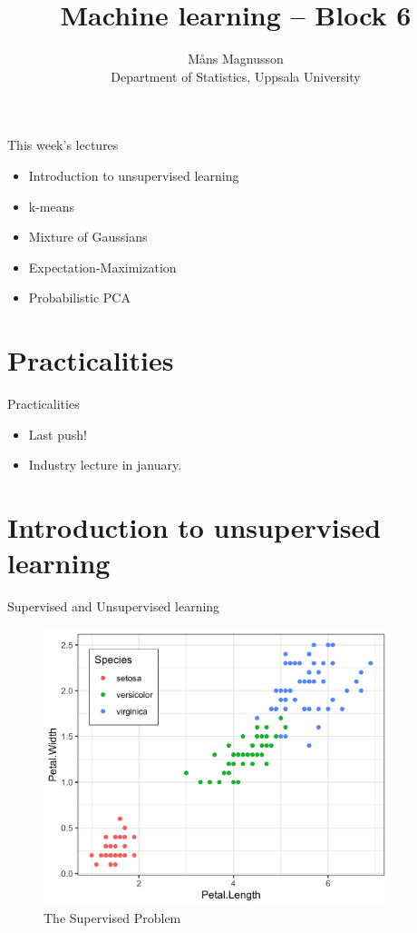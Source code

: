 \documentclass[10pt]{beamer}
\title[]{{\color{black}Machine learning -- Block 6}}
\author[]{M{\aa}ns Magnusson\\Department of Statistics, Uppsala University}
\date{\currentsemester}
\begin{document}
\frame{\titlepage
}



\begin{frame}{This week's lectures}
\begin{itemize}
\item Introduction to unsupervised learning
\item k-means
\item Mixture of Gaussians
\item Expectation-Maximization
\item Probabilistic PCA
\end{itemize}
\end{frame}





\section{Practicalities}

\begin{frame}{Practicalities}

\begin{itemize}
\item Last push!
\item Industry lecture in january.
\end{itemize}

\end{frame}


\section{Introduction to unsupervised learning}
\frame{\sectionpage}

\begin{frame}{Supervised and Unsupervised learning}

\begin{figure}[h]
\centering
\includegraphics[width=0.9\textwidth]{fig/iris_supervised.png}
\caption{The Supervised Problem}
\end{figure}

\end{frame}
\end{document}

